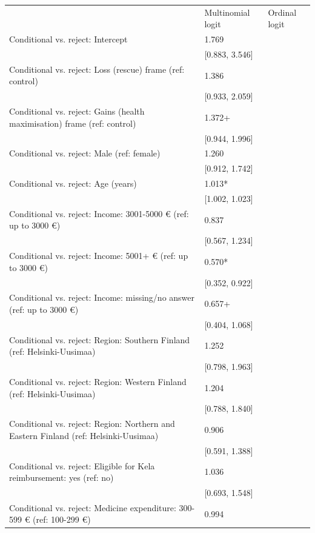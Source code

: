 \begin{tabular}{lll}
& Multinomial logit & Ordinal logit \\
Conditional vs. reject: Intercept & \num{1.769} &  \\
& [\num{0.883}, \num{3.546}] &  \\
Conditional vs. reject: Loss (rescue) frame (ref: control) & \num{1.386} &  \\
& [\num{0.933}, \num{2.059}] &  \\
Conditional vs. reject: Gains (health maximisation) frame (ref: control) & \num{1.372}+ &  \\
& [\num{0.944}, \num{1.996}] &  \\
Conditional vs. reject: Male (ref: female) & \num{1.260} &  \\
& [\num{0.912}, \num{1.742}] &  \\
Conditional vs. reject: Age (years) & \num{1.013}* &  \\
& [\num{1.002}, \num{1.023}] &  \\
Conditional vs. reject: Income: 3001-5000 € (ref: up to 3000 €) & \num{0.837} &  \\
& [\num{0.567}, \num{1.234}] &  \\
Conditional vs. reject: Income: 5001+ € (ref: up to 3000 €) & \num{0.570}* &  \\
& [\num{0.352}, \num{0.922}] &  \\
Conditional vs. reject: Income: missing/no answer (ref: up to 3000 €) & \num{0.657}+ &  \\
& [\num{0.404}, \num{1.068}] &  \\
Conditional vs. reject: Region: Southern Finland (ref: Helsinki-Uusimaa) & \num{1.252} &  \\
& [\num{0.798}, \num{1.963}] &  \\
Conditional vs. reject: Region: Western Finland (ref: Helsinki-Uusimaa) & \num{1.204} &  \\
& [\num{0.788}, \num{1.840}] &  \\
Conditional vs. reject: Region: Northern and Eastern Finland (ref: Helsinki-Uusimaa) & \num{0.906} &  \\
& [\num{0.591}, \num{1.388}] &  \\
Conditional vs. reject: Eligible for Kela reimbursement: yes (ref: no) & \num{1.036} &  \\
& [\num{0.693}, \num{1.548}] &  \\
Conditional vs. reject: Medicine expenditure: 300-599 € (ref: 100-299 €) & \num{0.994} &  \\

\end{tabular}
